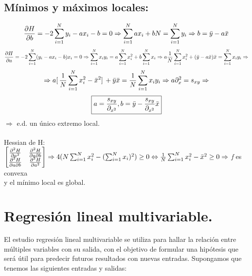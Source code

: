 \documentclass[a4paper,10pt]{article}
\begin{document}
\subsection{Mínimos y máximos locales:}
\[\frac{\partial{H}}{\partial{b}}=-2\sum_{i=1}^{N}y_{i}-ax_{i}-b=0\Rightarrow \sum_{i=1}^{N}ax_{i}+bN=\sum_{i=1}^{N}y_{i}\Rightarrow b=\Bar{y}-a\Bar{x}\]
\[\frac{\partial{H}}{\partial{a}}=-2\sum_{i=1}^{N}(y_{i}-ax_{i}-b)x_{i}=0\Rightarrow \sum_{i=1}^{N}x_{i}y_{i}=a\sum_{i=1}^{N}x_{i}^2+b\sum_{i=1}^{N}x_{i}\Rightarrow a \frac{1}{N}\sum_{i=1}^{N}x_{i}^2+(\Bar{y}-a\Bar{x})\Bar{x}=\sum_{i=1}^{N}x_{i}y_{i}\Rightarrow\] 
\[\Rightarrow a[ \,\frac{1}{N} \sum_{i=1}^{N} x_{i}^2-\Bar{x}^2] \,+\Bar{y}\Bar{x}=\frac{1}{N}\sum_{i=1}^{N}x_{i}y_{i}\Rightarrow a\partial_x^2=s_{xy}\Rightarrow\]
\[\boxed{a=\frac{s_{xy}}{\partial_{x^2}}, b=\Bar{y}-\frac{s_{xy}}{\partial_{x^2}}\Bar{x}}\]
$\Rightarrow$ e.d. un único extremo local.\\
\\
Hessian de H: $
\begin{bmatrix}
    \frac{\partial^2 H}{\partial a^2} & \frac{\partial^2 H}{\partial a \partial b} \\
    \frac{\partial^2 H}{\partial a \partial b} & \frac{\partial^2 H}{\partial a^2}
\end{bmatrix} \Rightarrow 4(N\sum_{i=1}^{N}x_{i}^2-(\sum_{i=1}^{N}x_{i})^2)\geq 0 \Leftrightarrow \frac{1}{N}\sum_{i=1}^{N}x_{i}^2 - \Bar{x}^2 \geq 0 \Rightarrow$ \textit{f} es convexa \\ y el mínimo local es global.

\section{Regresión lineal multivariable.}
\noindent
El estudio regresión lineal multivariable se utiliza para hallar la relación entre múltiples variables con su salida, con el objetivo de formular una hipótesis que será útil para predecir futuros resultados con nuevas entradas. Supongamos que tenemos las siguientes entradas y salidas: 
\end{document}
